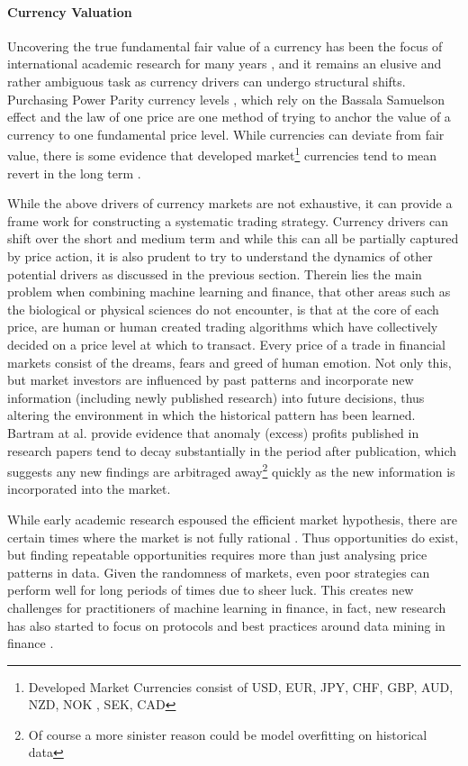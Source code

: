 \documentclass[11pt]{article}
\begin{document}
\paragraph{Currency Valuation}
Uncovering the true fundamental fair value of a currency has been the focus of international academic research for many years \cite{Rogoff1996}, and it remains an elusive and rather ambiguous task as currency drivers can undergo structural shifts. Purchasing Power Parity currency levels , which rely on the Bassala Samuelson effect and the law of one price \cite{Hassan2016} are one method of trying to anchor the value of a currency to one fundamental price level. While currencies can deviate from fair value, there is some evidence that developed market\footnote{Developed Market Currencies consist of USD, EUR, JPY, CHF, GBP, AUD, NZD, NOK , SEK, CAD} currencies tend to mean revert in the long term \cite{CaZorzi2016}.


While the above drivers of currency markets are not exhaustive, it can provide a frame work for constructing a systematic trading strategy. Currency drivers can shift over the short and medium term and while this can all be partially captured by price action, it is also prudent to try to understand the dynamics of other potential drivers as discussed in the previous section. \newline
Therein lies the main problem when combining machine learning and finance, that other areas such as the biological or physical sciences do not encounter, is that at the core of each price, are human or human created trading algorithms which have collectively decided on a price level at which to transact. \newline Every price of a trade in financial markets consist of the dreams, fears and greed of human emotion. Not only this, but market investors are influenced by past patterns and incorporate new information (including newly published research) into future decisions, thus altering the environment in which the historical pattern has been learned. Bartram at al. provide evidence that anomaly (excess) profits published in research papers tend to decay substantially in the period after publication, which suggests any new findings are arbitraged away\footnote{Of course a more sinister reason could be model overfitting on historical data} quickly as the new information is incorporated into the market\cite{Bartram2019}. 

While early academic research espoused the efficient market hypothesis, there are certain times where the market is not fully rational \cite{Dome2008}. Thus opportunities do exist, but finding repeatable opportunities requires more than just analysing price patterns in data. Given the randomness of markets, even poor strategies can perform well for long periods of times due to sheer luck. This creates new challenges for practitioners of machine learning in finance, in fact, new research has also started to focus on protocols and best practices around data mining in finance \cite{Arnott2018}.
\end{document}
